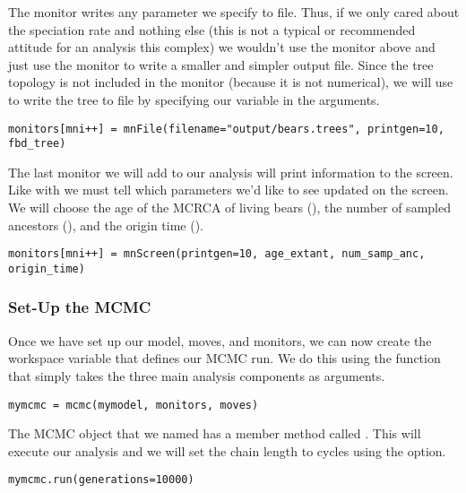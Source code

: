 The  monitor writes any parameter we specify to file.
Thus, if we only cared about the speciation rate and nothing else (this is not a typical or recommended attitude for an analysis this complex) we wouldn't use the  monitor above and just use the  monitor to write a smaller and simpler output file.
Since the tree topology is not included in the  monitor (because it is not numerical), we will use  to write the tree to file by specifying our  variable in the arguments.
{\tt \begin{snugshade*}
\begin{lstlisting}
monitors[mni++] = mnFile(filename="output/bears.trees", printgen=10, fbd_tree)
\end{lstlisting}
\end{snugshade*}}

The last monitor we will add to our analysis will print information to the screen.
Like with  we must tell  which parameters we'd like to see updated on the screen. 
We will choose the age of the MCRCA of living bears (), the number of sampled ancestors (), and the origin time ().
{\tt \begin{snugshade*}
\begin{lstlisting}
monitors[mni++] = mnScreen(printgen=10, age_extant, num_samp_anc, origin_time)
\end{lstlisting}
\end{snugshade*}}

\medskip
\subsubsection{Set-Up the MCMC}

Once we have set up our model, moves, and monitors, we can now create the workspace variable that defines our MCMC run. 
We do this using the  function that simply takes the three main analysis components as arguments.
{\tt \begin{snugshade*}
\begin{lstlisting}
mymcmc = mcmc(mymodel, monitors, moves)
\end{lstlisting}
\end{snugshade*}}

The MCMC object that we named  has a member method called . 
This will execute our analysis and we will set the chain length to  cycles using the  option.
{\tt \begin{snugshade*}
\begin{lstlisting}
mymcmc.run(generations=10000)
\end{lstlisting}
\end{snugshade*}}

